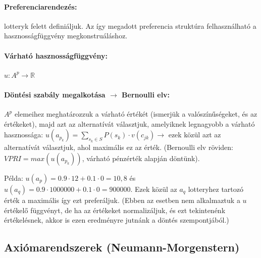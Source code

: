 \documentclass[a4paper,12pt]{article}
\begin{document}

\paragraph{Preferenciarendezés: } lotteryk felett definiáljuk. Az így megadott preferencia struktúra felhasználható a hasznosságfüggvény megkonstruáláshoz. %

\paragraph{Várható hasznosságfüggvény:}  $u: A^p \rightarrow \mathbb{R}$  %


\paragraph{Döntési szabály megalkotása  $\rightarrow$ Bernoulli elv: } $A^p$ elemeihez meghatározzuk a várható értékét (ismerjük a valószínűségeket, és az értékeket), majd azt az alternatívát választjuk, amelyiknek legnagyobb a várható hasznossága: $u(a_{p_k})= \sum_{s_k \in S} P(s_k)\cdot v(c_{jk}) \rightarrow$ ezek közül azt az alternatívát választjuk, ahol maximális ez az érték. (Bernoulli elv röviden: $VPRI=max(u(a_{p_k}))$, várható pénzérték alapján döntünk).




Példa: $u(a_p)= 0.9\cdot 12 + 0.1\cdot 0 = 10,8$ és $u(a_q)= 0.9\cdot 1000000 + 0.1\cdot 0 = 900000$. Ezek közül az $a_q$ lotteryhez tartozó érték a maximális így ezt preferáljuk. (Ebben az esetben nem alkalmaztuk a $u$ értékelő függvényt, de ha az értékeket normalizáljuk, és ezt tekintenénk értékelésnek, akkor is ezen eredményre jutnánk a döntés szempontjából.)

\subsection{Axiómarendszerek (Neumann-Morgenstern)} 
\end{document}
